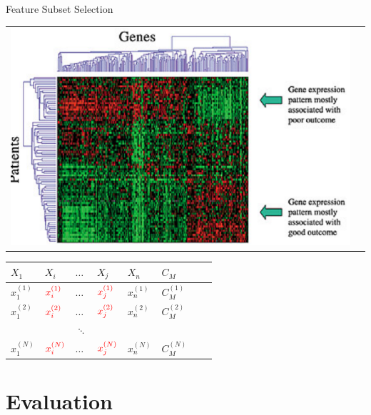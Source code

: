 \documentclass{beamer}
\begin{document}
\begin{frame}{Feature Subset Selection}



\begin{center}
\begin{tabular}{ll}
\includegraphics[width=.4\textwidth]{./figs/supervisedClassificationFSS} & 
\end{tabular}
\end{center}


\begin{center}
\scriptsize
\begin{tabular}{lllllll|l}
  $X_1$  & \color{red}$X_i$ & $\ldots$  & \color{red}$X_j$ & $X_n$ & $C_M$ \\
  \hline
  $x^{(1)}_1$ & $\color{red}x^{(1)}_i$ & $\ldots$ & $\color{red}x^{(1)}_j$ & $x^{(1)}_n$ & $C^{(1)}_M$ \\
  $x^{(2)}_1$ & $\color{red}x^{(2)}_i$ & $\ldots$ & $\color{red}x^{(2)}_j$ & $x^{(2)}_n$ & $C^{(2)}_M$ \\
 		&  	&	$\ddots$	&  \\	
  $x^{(N)}_1$ & $\color{red}x^{(N)}_i$ & $\ldots$ & $\color{red}x^{(N)}_j$ & $x^{(N)}_n$ & $C^{(N)}_M$ \\
\hline
\end{tabular}
\end{center}

\end{frame}


% 

\section{Evaluation}
\end{document}
